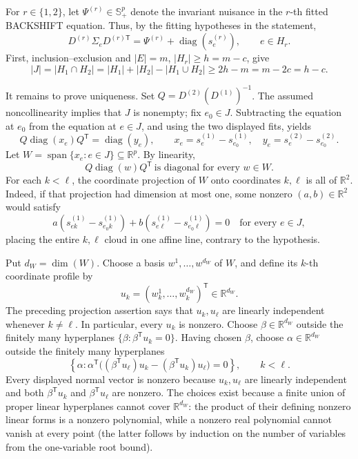 For \(r\in\{1,2\}\), let \(\Psi^{(r)}\in\mathbb S_+^p\) denote the invariant nuisance in the \(r\)-th fitted BACKSHIFT equation.  Thus, by the fitting hypotheses in the statement,
\[
D^{(r)}\Sigma_eD^{(r)\mathsf T}
 =\Psi^{(r)}+\operatorname{diag}(s^{(r)}_e),
 \qquad e\in H_r.
\]
First, inclusion--exclusion and \(|E|=m\), \(|H_r|\ge h=m-c\), give
\[
 |J|=|H_1\cap H_2|
 =|H_1|+|H_2|-|H_1\cup H_2|
 \ge 2h-m=m-2c=h-c.
\]

It remains to prove uniqueness.  Set \(Q=D^{(2)}(D^{(1)})^{-1}\).  The assumed noncollinearity implies that \(J\) is nonempty; fix \(e_0\in J\).  Subtracting the equation at \(e_0\) from the equation at \(e\in J\), and using the two displayed fits, yields
\[
 Q\operatorname{diag}(x_e)Q^{\mathsf T}
   =\operatorname{diag}(y_e),\qquad
 x_e=s^{(1)}_e-s^{(1)}_{e_0},\quad
 y_e=s^{(2)}_e-s^{(2)}_{e_0}.
\]
Let \(W=\operatorname{span}\{x_e:e\in J\}\subseteq\mathbb R^p\).  By linearity,
\[
 Q\operatorname{diag}(w)Q^{\mathsf T}\ \text{is diagonal for every }w\in W. \tag{1}
\]
For each \(k<\ell\), the coordinate projection of \(W\) onto coordinates \(k,\ell\) is all of \(\mathbb R^2\).  Indeed, if that projection had dimension at most one, some nonzero \((a,b)\in\mathbb R^2\) would satisfy
\[
 a(s^{(1)}_{ek}-s^{(1)}_{e_0k})
 +b(s^{(1)}_{e\ell}-s^{(1)}_{e_0\ell})=0
 \quad\text{for every }e\in J,
\]
placing the entire \(k,\ell\) cloud in one affine line, contrary to the hypothesis.

Put \(d_W=\dim(W)\).  Choose a basis \(w^1,\ldots,w^{d_W}\) of \(W\), and define its \(k\)-th coordinate profile by
\[
 u_k=(w^1_k,\ldots,w^{d_W}_k)^{\mathsf T}\in\mathbb R^{d_W}.
\]
The preceding projection assertion says that \(u_k,u_\ell\) are linearly independent whenever \(k\ne\ell\).  In particular, every \(u_k\) is nonzero.  Choose \(\beta\in\mathbb R^{d_W}\) outside the finitely many hyperplanes \(\{\beta:\beta^{\mathsf T}u_k=0\}\).  Having chosen \(\beta\), choose \(\alpha\in\mathbb R^{d_W}\) outside the finitely many hyperplanes
\[
 \left\{\alpha:\alpha^{\mathsf T}\bigl((\beta^{\mathsf T}u_\ell)u_k-(\beta^{\mathsf T}u_k)u_\ell\bigr)=0\right\},\qquad k<\ell.
\]
Every displayed normal vector is nonzero because \(u_k,u_\ell\) are linearly independent and both \(\beta^{\mathsf T}u_k\) and \(\beta^{\mathsf T}u_\ell\) are nonzero.  The choices exist because a finite union of proper linear hyperplanes cannot cover \(\mathbb R^{d_W}\): the product of their defining nonzero linear forms is a nonzero polynomial, while a nonzero real polynomial cannot vanish at every point (the latter follows by induction on the number of variables from the one-variable root bound).

